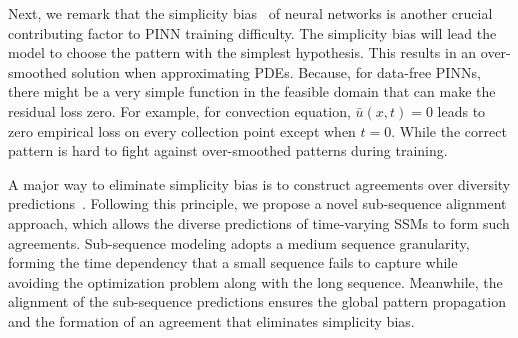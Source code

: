 


Next, we remark that the simplicity bias~\cite{shah2020pitfalls} of neural networks is another crucial contributing factor to PINN training difficulty. The simplicity bias will lead the model to choose the pattern with the simplest hypothesis. This results in an over-smoothed solution when approximating PDEs. Because, for data-free PINNs, there might be a very simple function in the feasible domain that can make the residual loss zero. For example, for convection equation, $\bar u(x,t)=0$ leads to zero empirical loss on every collection point except when $t=0$. While the correct pattern is hard to fight against over-smoothed patterns during training.

A major way to eliminate simplicity bias is to construct agreements over diversity predictions~\cite{teney2022evading}. Following this principle, we propose a novel sub-sequence alignment approach, which allows the diverse predictions of time-varying SSMs to form such agreements. %
Sub-sequence modeling adopts a medium sequence granularity, forming the time dependency that a small sequence fails to capture while avoiding the optimization problem along with the long sequence. 
Meanwhile, the alignment of the sub-sequence predictions ensures the global pattern propagation and the formation of an agreement that eliminates simplicity bias.


